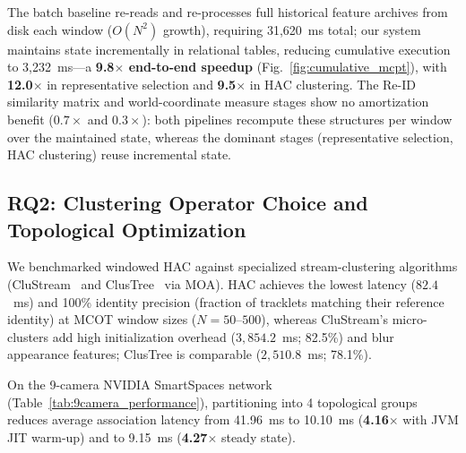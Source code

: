 \documentclass[conference]{IEEEtran}
\begin{document}
The batch baseline re-reads and re-processes full historical feature archives from disk each window ($O(N^2)$ growth), requiring 31,620~ms total; our system maintains state incrementally in relational tables, reducing cumulative execution to 3,232~ms---a \textbf{9.8$\times$ end-to-end speedup} (Fig.~\ref{fig:cumulative_mcpt}), with \textbf{12.0$\times$} in representative selection and \textbf{9.5$\times$} in HAC clustering. The Re-ID similarity matrix and world-coordinate measure stages show no amortization benefit ($0.7\times$ and $0.3\times$): both pipelines recompute these structures per window over the maintained state, whereas the dominant stages (representative selection, HAC clustering) reuse incremental state.

\subsection{RQ2: Clustering Operator Choice and Topological Optimization}
We benchmarked windowed HAC against specialized stream-clustering algorithms (CluStream~\cite{aggarwal2003framework} and ClusTree~\cite{kranen2011clustree} via MOA). HAC achieves the lowest latency ($82.4$~ms) and 100\% identity precision (fraction of tracklets matching their reference identity) at MCOT window sizes ($N=50$--$500$), whereas CluStream's micro-clusters add high initialization overhead ($3{,}854.2$~ms; 82.5\%) and blur appearance features; ClusTree is comparable ($2{,}510.8$~ms; 78.1\%).

On the 9-camera NVIDIA SmartSpaces network (Table~\ref{tab:9camera_performance}), partitioning into 4 topological groups reduces average association latency from 41.96~ms to 10.10~ms (\textbf{4.16$\times$} with JVM JIT warm-up) and to 9.15~ms (\textbf{4.27$\times$} steady state).

\begin{table}[t!]
\centering
\caption{Topological Optimization Impact (NVIDIA SmartSpaces, 10 Runs)}
\label{tab:9camera_performance}
\end{table}
\end{document}
